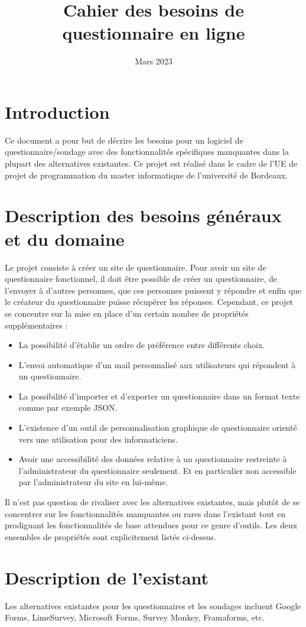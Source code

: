 \documentclass{article}
\title{Cahier des besoins de questionnaire en ligne}
\date{Mars 2023}
\begin{document}
\section{Introduction}
Ce document a pour but de décrire les besoins pour un logiciel de questionnaire/sondage avec des fonctionnalités spécifiques manquantes dans la plupart des alternatives existantes. Ce projet est réalisé dans le cadre de l'UE de projet de programmation du master informatique de l'université de Bordeaux.

\section{Description des besoins généraux et du domaine}
Le projet consiste à créer un site de questionnaire. Pour avoir un site de questionnaire fonctionnel, il doit être possible de créer un questionnaire, de l'envoyer à d'autres personnes, que ces personnes puissent y répondre et enfin que le créateur du questionnaire puisse récupérer les réponses. Cependant, ce projet se concentre sur la mise en place d'un certain nombre de propriétés supplémentaires :
\begin{itemize}[noitemsep]
\item La possibilité d'établir un ordre de préférence entre différents choix.
\item L'envoi automatique d'un mail personnalisé aux utilisateurs qui répondent à un questionnaire.
\item La possibilité d'importer et d'exporter un questionnaire dans un format texte comme par exemple JSON.
\item L'existence d'un outil de personnalisation graphique de questionnaire orienté vers une utilisation pour des informaticiens.
\item Avoir une accessibilité des données relative à un questionnaire restreinte à l'administrateur du questionnaire seulement. Et en particulier non accessible par l'administrateur du site en lui-même.
\end{itemize}
Il n'est pas question de rivaliser avec les alternatives existantes, mais plutôt de se concentrer sur les fonctionnalités manquantes ou rares dans l'existant tout en prodiguant les fonctionnalités de base attendues pour ce genre d'outils. Les deux ensembles de propriétés sont explicitement listés ci-dessus.

\section{Description de l'existant}
Les alternatives existantes pour les questionnaires et les sondages incluent Google Forms, LimeSurvey, Microsoft Forms, Survey Monkey, Framaforms, etc.
\end{document}

